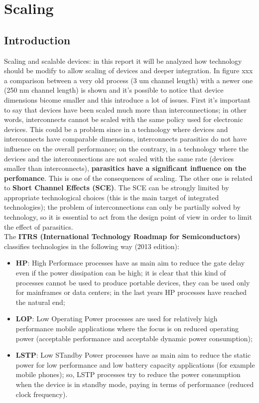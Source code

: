 \documentclass[a4paper, 12pt, twoside, openright]{report}
\begin{document}
\tableofcontents

\chapter{Scaling}

\section{Introduction}

Scaling and scalable devices: in this report it will be analyzed how technology should be modify to allow scaling of devices and deeper integration.
In figure xxx a comparison between a very old process (3 um channel length) with a newer one (250 nm channel length) is shown and it's possible to notice that device dimensions bicome smaller and this introduce a lot of issues.
First it's important to say that devices have been scaled much more than interconnections; in other words, interconnects cannot be scaled with the same policy used for electronic devices. This could be a problem since in a technology where devices and interconnects have comparable dimensions, interconnects parasitics do not have influence on the overall performance; on the contrary, in a technology where the devices and the interconnections are not scaled with the same rate (devices smaller than interconnects), \textbf{parasitics have a significant influence on the perfomance}. This is one of the consequences of scaling. The other one is related to \textbf{Short Channel Effects (SCE)}. The SCE can be strongly limited by appropriate technological choices (this is the main target of integrated technologies); the problem of interconnections can only be partially solved by technology, so it is essential to act from the design point of view in order to limit the effect of parasitics.\\

The \textbf{ITRS (International Technology Roadmap for Semiconductors)} classifies technologies in the following way (2013 edition):

	\begin{itemize}
	\item \textbf{HP}: High Performace processes have as main aim to reduce the gate delay even if the power dissipation can be high; it is clear that this kind of processes cannot be used to produce portable devices, they can be used only for mainframes or data centers; in the last years HP processes have reached the natural end;
	\item \textbf{LOP}: Low Operating Power processes are used for relatively high performance mobile applications where the focus is on reduced operating power (acceptable performance and acceptable dynamic power consumption);
	\item \textbf{LSTP}: Low STandby Power processes have as main aim to reduce the static power for low performance and low battery capacity applications (for example mobile phones); so, LSTP processes try to reduce the power consumption when the device is in standby mode, paying in terms of performance (reduced clock frequency).
	\end{itemize}
\end{document}
